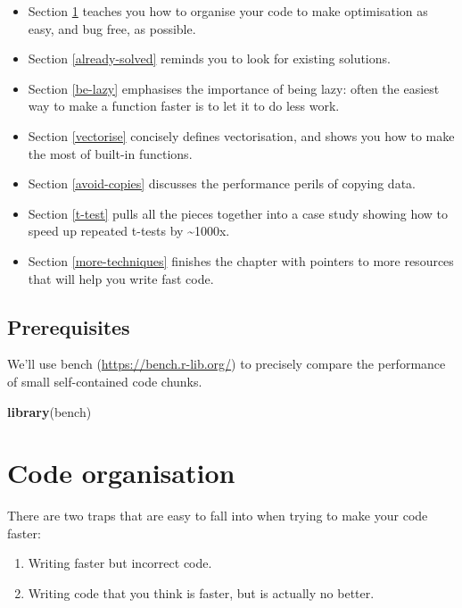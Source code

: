 \documentclass[]{book}
\newenvironment{Shaded}{\begin{snugshade}}{\end{snugshade}}
\newcommand{\KeywordTok}[1]{\textcolor[rgb]{0.27,0.27,0.27}{\textbf{#1}}}
\newcommand{\NormalTok}[1]{#1}
\providecommand{\tightlist}{%
  \setlength{\itemsep}{0pt}\setlength{\parskip}{0pt}}
\renewcommand{\href}[2]{#2 (\url{#1})}
\begin{document}
\begin{itemize}
\item
  Section \ref{code-organisation} teaches you how to organise
  your code to make optimisation as easy, and bug free, as possible.
\item
  Section \ref{already-solved} reminds you to look for existing
  solutions.
\item
  Section \ref{be-lazy} emphasises the importance of
  being lazy: often the easiest way to make a function faster is to
  let it to do less work.
\item
  Section \ref{vectorise} concisely defines vectorisation, and shows you
  how to make the most of built-in functions.
\item
  Section \ref{avoid-copies} discusses the performance perils of
  copying data.
\item
  Section \ref{t-test} pulls all the pieces together into a case
  study showing how to speed up repeated t-tests by \textasciitilde{}1000x.
\item
  Section \ref{more-techniques} finishes the chapter with pointers to
  more resources that will help you write fast code.
\end{itemize}

\hypertarget{prerequisites-6}{%
\subsection*{Prerequisites}\label{prerequisites-6}}

We'll use \href{https://bench.r-lib.org/}{bench} to precisely compare the performance of small self-contained code chunks.

\begin{Shaded}
\begin{Highlighting}[]
\KeywordTok{library}\NormalTok{(bench)}
\end{Highlighting}
\end{Shaded}

\hypertarget{code-organisation}{%
\section{Code organisation}\label{code-organisation}}


There are two traps that are easy to fall into when trying to make your code faster:

\begin{enumerate}
\def\labelenumi{\arabic{enumi}.}
\tightlist
\item
  Writing faster but incorrect code.
\item
  Writing code that you think is faster, but is actually no better.
\end{enumerate}
\end{document}
